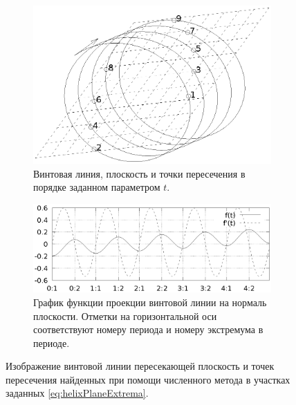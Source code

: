 \begin{figure}
     \centering
     \begin{subfigure}[b]{0.3\textwidth}
         \centering
         \includegraphics[trim={2.2cm 4cm 2cm 4cm},clip,width=.5,width=\textwidth]{images/arttrack/helix.eps}
         \caption{Винтовая линия, плоскость и точки пересечения в порядке
         заданном параметром $t$.}
         \label{fig:helixPlaneProblem}
     \end{subfigure}
     \hfill
     \begin{subfigure}[b]{0.6\textwidth}
         \centering
         \includegraphics[width=\textwidth]{images/arttrack/helix-plane-func.eps}
         \caption{График функции проекции винтовой линии на нормаль плоскости.
         Отметки на горизонтальной оси соответствуют номеру периода и номеру
         экстремума в периоде.}
         \label{fig:hlxPlaneFuncAndDeriv}
     \end{subfigure}
        \caption{Изображение винтовой линии пересекающей плоскость и точек
            пересечения найденных при помощи численного метода в участках
            заданных \eqref{eq:helixPlaneExtrema}.}
        \label{fig:helixPlaneProblem}
\end{figure}

